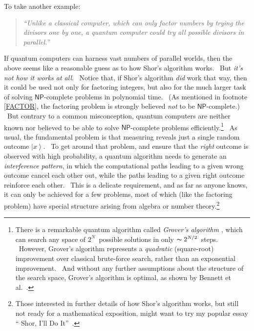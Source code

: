 \documentclass[12pt,onecolumn]{article}%
\begin{document}
To take another example:

\begin{quotation}
\noindent\textit{\textquotedblleft Unlike a classical computer, which can only
factor numbers by trying the divisors one by one, a quantum computer could try
all possible divisors in parallel.\textquotedblright}
\end{quotation}

If quantum computers can harness vast numbers of parallel worlds, then the
above seems like a reasonable guess as to how Shor's algorithm works. \ But
\textit{it's not how it works at all}. \ Notice that, if Shor's algorithm
\textit{did} work that way, then it could be used not only for factoring
integers, but also for the much larger task of solving $\mathsf{NP}$-complete
problems in polynomial time. \ (As mentioned in footnote \ref{FACTOR}, the
factoring problem is strongly believed \textit{not} to be $\mathsf{NP}%
$-complete.) \ But contrary to a common misconception, quantum computers are
neither known nor believed to be able to solve $\mathsf{NP}$-complete problems
efficiently.\footnote{There is a remarkable quantum algorithm called
\textit{Grover's algorithm} \cite{grover}, which can search any space of
$2^{N}$\ possible solutions in only $\thicksim2^{N/2}$\ steps. \ However,
Grover's algorithm represents a \textit{quadratic} (square-root) improvement
over classical brute-force search, rather than an exponential improvement.
\ And without any further assumptions about the structure of the search space,
Grover's algorithm is optimal, as shown by Bennett et al.\ \cite{bbbv}.} \ As
usual, the fundamental problem is that measuring reveals just a single random
outcome $\left\vert x\right\rangle $. \ To get around that problem, and ensure
that the \textit{right} outcome is observed with high probability, a quantum
algorithm needs to generate an \textit{interference pattern}, in which the
computational paths leading to a given wrong outcome cancel each other out,
while the paths leading to a given right outcome reinforce each other. \ This
is a delicate requirement, and as far as anyone knows, it can only be achieved
for a few problems, most of which (like the factoring problem) have special
structure arising from algebra or number theory.\footnote{Those interested in
further details of how Shor's algorithm works, but still not ready for a
mathematical exposition, might want to try my popular essay \textquotedblleft
Shor, I'll Do It\textquotedblright\ \cite{aar:shor}.}
\end{document}
